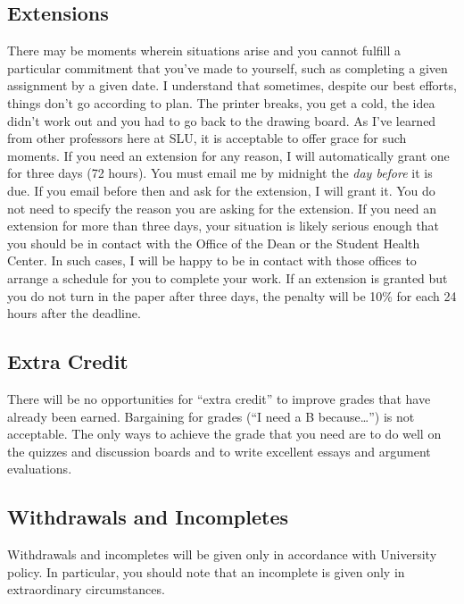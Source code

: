 \documentclass[11pt,]{article}
\begin{document}
\subsection{Extensions}\label{extensions}

There may be moments wherein situations arise and you cannot fulfill a
particular commitment that you've made to yourself, such as completing a
given assignment by a given date. I understand that sometimes, despite
our best efforts, things don't go according to plan. The printer breaks,
you get a cold, the idea didn't work out and you had to go back to the
drawing board. As I've learned from other professors here at SLU, it is
acceptable to offer grace for such moments. If you need an extension for
any reason, I will automatically grant one for three days (72 hours).
You must email me by midnight the \emph{day before} it is due. If you
email before then and ask for the extension, I will grant it. You do not
need to specify the reason you are asking for the extension. If you need
an extension for more than three days, your situation is likely serious
enough that you should be in contact with the Office of the Dean or the
Student Health Center. In such cases, I will be happy to be in contact
with those offices to arrange a schedule for you to complete your work.
If an extension is granted but you do not turn in the paper after three
days, the penalty will be 10\% for each 24 hours after the deadline.

\subsection{Extra Credit}\label{extra-credit}

There will be no opportunities for ``extra credit'' to improve grades
that have already been earned. Bargaining for grades (``I need a B
because\ldots{}'') is not acceptable. The only ways to achieve the grade
that you need are to do well on the quizzes and discussion boards and to
write excellent essays and argument evaluations.

\subsection{Withdrawals and
Incompletes}\label{withdrawals-and-incompletes}

Withdrawals and incompletes will be given only in accordance with
University policy. In particular, you should note that an incomplete is
given only in extraordinary circumstances.
\end{document}
